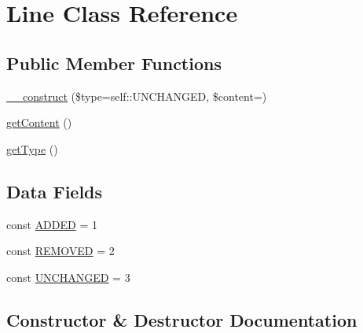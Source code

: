 \hypertarget{class_sebastian_bergmann_1_1_diff_1_1_line}{}\section{Line Class Reference}
\label{class_sebastian_bergmann_1_1_diff_1_1_line}
\subsection*{Public Member Functions}
\begin{DoxyCompactItemize}
\item 
\mbox{\hyperlink{class_sebastian_bergmann_1_1_diff_1_1_line_a9874eb1e1bbec9ee28dba16bf2baeb58}{\+\_\+\+\_\+construct}} (\$type=self\+::\+U\+N\+C\+H\+A\+N\+G\+ED, \$content=\textquotesingle{}\textquotesingle{})
\item 
\mbox{\hyperlink{class_sebastian_bergmann_1_1_diff_1_1_line_a58e43f09a06ce4e29b192c4e17ce7915}{get\+Content}} ()
\item 
\mbox{\hyperlink{class_sebastian_bergmann_1_1_diff_1_1_line_a830b5c75df72b32396701bc563fbe3c7}{get\+Type}} ()
\end{DoxyCompactItemize}
\subsection*{Data Fields}
\begin{DoxyCompactItemize}
\item 
const \mbox{\hyperlink{class_sebastian_bergmann_1_1_diff_1_1_line_a9dcf44632176616f583582396a5d6ec9}{A\+D\+D\+ED}} = 1
\item 
const \mbox{\hyperlink{class_sebastian_bergmann_1_1_diff_1_1_line_a407d200e9f16e51a21be57a9fcec09f0}{R\+E\+M\+O\+V\+ED}} = 2
\item 
const \mbox{\hyperlink{class_sebastian_bergmann_1_1_diff_1_1_line_a4aebc93452a080d340addea1ef92b4dc}{U\+N\+C\+H\+A\+N\+G\+ED}} = 3
\end{DoxyCompactItemize}


\subsection{Constructor \& Destructor Documentation}
\mbox{\label{class_sebastian_bergmann_1_1_diff_1_1_line_a9874eb1e1bbec9ee28dba16bf2baeb58}} 
